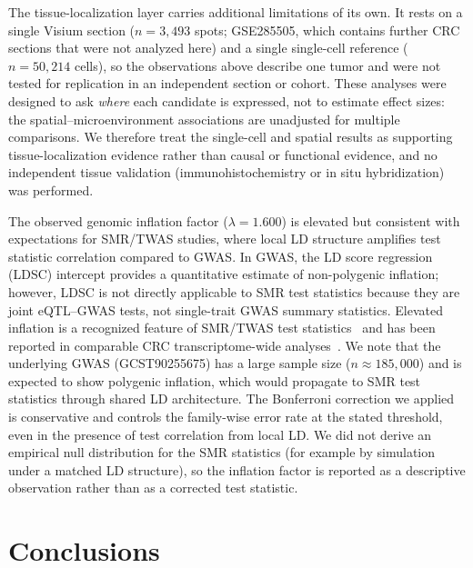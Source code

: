 \documentclass[11pt,a4paper]{article}
\begin{document}
The tissue-localization layer carries additional limitations of its own. It rests on a
single Visium section ($n = 3{,}493$ spots; GSE285505, which contains further CRC
sections that were not analyzed here) and a single single-cell reference
($n = 50{,}214$ cells), so the observations above describe one tumor and were not tested
for replication in an independent section or cohort. These analyses were designed to ask
\emph{where} each candidate is expressed, not to estimate effect sizes: the
spatial--microenvironment associations are unadjusted for multiple comparisons. We therefore
treat the single-cell and spatial results as supporting
tissue-localization evidence rather than causal or functional evidence, and no independent
tissue validation (immunohistochemistry or in situ hybridization) was performed.

The observed genomic inflation factor ($\lambda = 1.600$) is elevated but
consistent with expectations for SMR/TWAS studies, where local LD structure
amplifies test statistic correlation compared to GWAS. In GWAS, the LD score
regression (LDSC) intercept provides a quantitative estimate of non-polygenic
inflation; however, LDSC is not directly applicable to SMR test statistics
because they are joint eQTL--GWAS tests, not single-trait GWAS summary
statistics. Elevated inflation is a recognized feature of SMR/TWAS test
statistics~\cite{wainberg2019, gusev2016integrative} and has been reported in
comparable CRC transcriptome-wide analyses~\cite{hazelwood2025multi}. We note
that the underlying GWAS (GCST90255675) has a large sample size
($n\approx185,000$) and is expected to show polygenic inflation, which would
propagate to SMR test statistics through shared LD architecture. The Bonferroni
correction we applied is conservative and controls the family-wise error rate
at the stated threshold, even in the presence of test correlation from local LD.
We did not derive an empirical null distribution for the SMR statistics (for
example by simulation under a matched LD structure), so the inflation factor is
reported as a descriptive observation rather than as a corrected test statistic.

\section{Conclusions}
\end{document}
